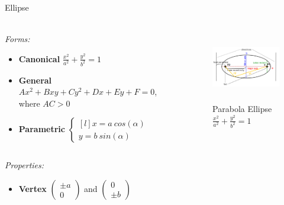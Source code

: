 \documentclass[aspectratio=169,notes]{beamer}
\begin{document}
\begin{frame}[t]{Ellipse}
    \framesubtitle{}
        \scriptsize
        \vspace{-0.4cm}
    \begin{columns}[T,onlytextwidth]
        \begin{column}{0.59\textwidth}
            \textit{Forms:} \\
            \begin{itemize}
                \item \textbf{Canonical} $\frac{x^2}{a^2}+\frac{y^2}{b^2}=1$
                \item \textbf{General} $Ax^2+Bxy+Cy^2+Dx+Ey+F=0$, where $AC > 0$
                \item \textbf{Parametric} $\left\{\begin{matrix*}[l] x = a\  cos(\alpha)\\ y = b\ sin(\alpha) \end{matrix*}\right.$
            \end{itemize}
        \end{column}
        \begin{column}{0.39\textwidth}
            \vspace{-0.5cm}
            \begin{figure}[H]
                \centering\includegraphics[height=3cm,width=1\textwidth,keepaspectratio]{Ellipse.png}
                \vspace{-0.5cm}
                \caption*{\scriptsize Parabola Ellipse $\frac{x^2}{a^2}+\frac{y^2}{b^2}=1$}
                \label{fig:Ellipse.png}
            \end{figure}
        \end{column}
    \end{columns}
    \vspace{-0.5cm}
    \textit{Properties:}
    \begin{multicols}{3}
        \begin{itemize}
            \item \textbf{Vertex} $\begin{pmatrix} \pm a\\0 \end{pmatrix}$ and $\begin{pmatrix} 0\\\pm b \end{pmatrix}$

\end{itemize}
\end{multicols}
\end{frame}
\end{document}
